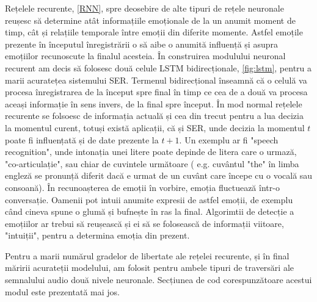 \documentclass[a4paper,12pt]{book}
\begin{document}
				Rețelele recurente, \ref{RNN}, spre deosebire de alte tipuri de rețele neuronale reușesc să determine atât informațiile emoționale de la un anumit moment de timp, cât  și relațiile temporale între emoții din diferite momente. Astfel emoțile prezente în începutul înregistrării o să aibe o anumită influență și asupra emoțiilor recunoscute la finalul acesteia. În construirea modulului neuronal recurent am decis să folosesc două celule LSTM bidirecționale, \ref{fig:lstm}, pentru a marii acuratețea sistemului SER. Termenul bidirecțional înseamnă că o celulă va procesa înregistrarea de la început spre final în timp ce cea de a două va procesa aceași informație în sens invers, de la final spre început. În mod normal rețelele recurente se folsoesc de informația actuală și cea din trecut pentru a lua decizia la momentul curent, totuși există aplicații, că și SER, unde decizia la momentul $t$ poate fi influențată și de date prezente la $t+1$. Un exemplu ar fi "speech recognition", unde intonația unei litere poate depinde de litera care o urmază, "co-articulație", sau chiar de cuvintele următoare ( e.g. cuvântul "the" în limba engleză se pronunță diferit dacă e urmat de un cuvânt care începe cu o vocală sau consoană). În recunoașterea de emoții în vorbire, emoția fluctuează într-o conversație. Oamenii pot intuii anumite expresii de astfel emoții, de exemplu când cineva spune o glumă și bufnește în ras la final. Algorimtii de detecție a emoțiilor ar trebui să reușească și ei să se folosească de informații viitoare, "intuiții", pentru a determina emoția din prezent. \par
				
				Pentru a marii numărul gradelor de libertate ale rețelei recurente, și în final măririi acurateții modelului, am folosit pentru ambele tipuri de traversări ale semnalului audio două nivele neuronale. Secțiunea de cod corespunzătoare acestui modul este prezentată mai jos.\par 
\end{document}
